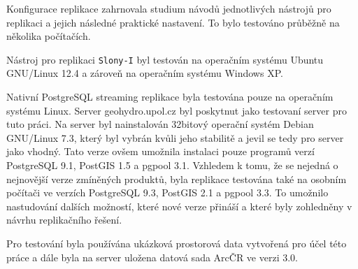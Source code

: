 Konfigurace replikace zahrnovala studium návodů jednotlivých nástrojů pro
replikaci a jejich následné praktické nastavení. To bylo testováno průběžně na
několika počítačích. 

Nástroj pro replikaci \texttt{Slony-I} byl testován na operačním systému Ubuntu
GNU/Linux 12.4 a zároveň na operačním systému Windows XP. 

Nativní PostgreSQL streaming replikace byla testována pouze na operačním
systému Linux. Server geohydro.upol.cz byl poskytnut jako testovaní server pro
tuto práci. Na server byl nainstalován 32bitový operační systém Debian
GNU/Linux 7.3, který byl vybrán kvůli jeho stabilitě a jevil se tedy pro server
jako vhodný. Tato verze ovšem umožnila instalaci pouze programů verzí
PostgreSQL 9.1, PostGIS 1.5 a pgpool 3.1. Vzhledem k tomu, že se nejedná o
nejnovější verze zmíněných produktů, byla replikace testována také na osobním
počítači ve verzích PostgreSQL 9.3, PostGIS 2.1 a pgpool 3.3. To umožnilo
nastudování dalších možností, které nové verze přináší a které byly zohledněny
v návrhu replikačního řešení. 

Pro testování byla používána ukázková prostorová data vytvořená pro účel této
práce a dále byla na server uložena datová sada ArcČR ve verzi 3.0.


